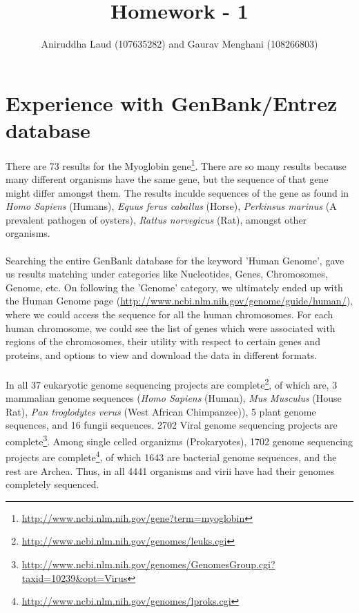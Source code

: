\documentclass{article}
\title{Homework - 1}
\author{Aniruddha Laud (107635282) and Gaurav Menghani (108266803)}
\begin{document}
\maketitle

\clearpage

\tableofcontents

\clearpage

\section{Experience with GenBank/Entrez database}
There are 73 results for the Myoglobin gene\footnote{\url{http://www.ncbi.nlm.nih.gov/gene?term=myoglobin}}. There are so many results because many different organisms have the same gene, but the sequence of that gene might differ amongst them.
The results inculde sequences of the gene as found in \textit{Homo Sapiens} (Humans), \textit{Equus ferus caballus} (Horse), \textit{Perkinsus marinus} (A prevalent pathogen of oysters), \textit{Rattus norvegicus} (Rat), amongst other organisms.\\
\\
Searching the entire GenBank database for the keyword 'Human Genome', gave us results matching under categories like Nucleotides, Genes, Chromosomes, Genome, etc. On following the 'Genome' category, we ultimately ended up with the Human Genome page (\url{http://www.ncbi.nlm.nih.gov/genome/guide/human/}), where we could access the sequence for all the human chromosomes. For each human chromosome, we could see the list of genes which were associated with regions of the chromosomes, their utility with respect to certain genes and proteins, and options to view and download the data in different formats.\\
\\
In all 37 eukaryotic genome sequencing projects are complete\footnote{\url{http://www.ncbi.nlm.nih.gov/genomes/leuks.cgi}}, of which are, 3 mammalian genome sequences (\textit{Homo Sapiens} (Human), \textit{Mus Musculus} (House Rat), \textit{Pan troglodytes verus} (West African Chimpanzee)), 5 plant genome sequences, and 16 fungii sequences. 2702 Viral genome sequencing projects are complete\footnote{\url{http://www.ncbi.nlm.nih.gov/genomes/GenomesGroup.cgi?taxid=10239&opt=Virus}}. Among single celled organizms (Prokaryotes), 1702 genome sequencing projects are complete\footnote{\url{http://www.ncbi.nlm.nih.gov/genomes/lproks.cgi}}, of which 1643 are bacterial genome sequences, and the rest are Archea. Thus, in all 4441 organisms and virii have had their genomes completely sequenced.
\end{document}
